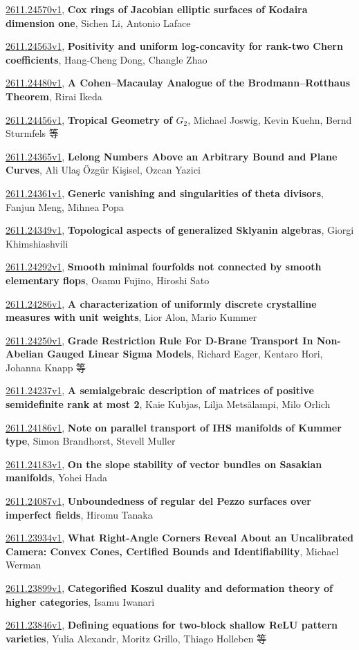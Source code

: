\documentclass[9pt, a4paper]{article}
\theoremstyle{plain}
\theoremstyle{definition}
\theoremstyle{remark}
\newcommand{\arxiv}[3]{\href{https://arxiv.org/abs/#1}{#1}, \textbf{\textcolor{arxivblue}{#2}}, #3}
\begin{document}
\arxiv{2611.24570v1}{Cox rings of Jacobian elliptic surfaces of Kodaira dimension one}{Sichen Li, Antonio Laface}

\arxiv{2611.24563v1}{Positivity and uniform log-concavity for rank-two Chern coefficients}{Hang-Cheng Dong, Changle Zhao}

\arxiv{2611.24480v1}{A Cohen--Macaulay Analogue of the Brodmann--Rotthaus Theorem}{Rirai Ikeda}

\arxiv{2611.24456v1}{Tropical Geometry of $G_2$}{Michael Joswig, Kevin Kuehn, Bernd Sturmfels 等}

\arxiv{2611.24365v1}{Lelong Numbers Above an Arbitrary Bound and Plane Curves}{Ali Ulaş Özgür Kişisel, Ozcan Yazici}

\arxiv{2611.24361v1}{Generic vanishing and singularities of theta divisors}{Fanjun Meng, Mihnea Popa}

\arxiv{2611.24349v1}{Topological aspects of generalized Sklyanin algebras}{Giorgi Khimshiashvili}

\arxiv{2611.24292v1}{Smooth minimal fourfolds not connected by smooth elementary flops}{Osamu Fujino, Hiroshi Sato}

\arxiv{2611.24286v1}{A characterization of uniformly discrete crystalline measures with unit weights}{Lior Alon, Mario Kummer}

\arxiv{2611.24250v1}{Grade Restriction Rule For D-Brane Transport In Non-Abelian Gauged Linear Sigma Models}{Richard Eager, Kentaro Hori, Johanna Knapp 等}

\arxiv{2611.24237v1}{A semialgebraic description of matrices of positive semidefinite rank at most 2}{Kaie Kubjas, Lilja Metsälampi, Milo Orlich}

\arxiv{2611.24186v1}{Note on parallel transport of IHS manifolds of Kummer type}{Simon Brandhorst, Stevell Muller}

\arxiv{2611.24183v1}{On the slope stability of vector bundles on Sasakian manifolds}{Yohei Hada}

\arxiv{2611.24087v1}{Unboundedness of regular del Pezzo surfaces over imperfect fields}{Hiromu Tanaka}

\arxiv{2611.23934v1}{What Right-Angle Corners Reveal About an Uncalibrated Camera: Convex Cones, Certified Bounds and Identifiability}{Michael Werman}

\arxiv{2611.23899v1}{Categorified Koszul duality and deformation theory of higher categories}{Isamu Iwanari}

\arxiv{2611.23846v1}{Defining equations for two-block shallow ReLU pattern varieties}{Yulia Alexandr, Moritz Grillo, Thiago Holleben 等}
\end{document}

